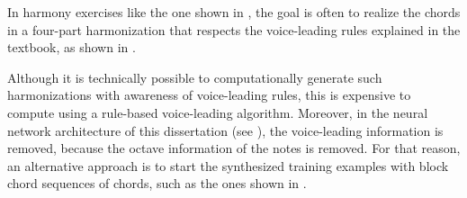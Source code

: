 
In harmony exercises like the one shown in
, the goal is often to
\gls{realize} the chords in a four-part harmonization that
respects the voice-leading rules explained in the textbook,
as shown in . 


Although it is technically possible to computationally
generate such harmonizations with awareness of voice-leading
rules, this is expensive to compute using a rule-based
voice-leading
algorithm.
Moreover, in the neural network architecture of this
dissertation (see ), the voice-leading
information is removed, because the octave information of
the notes is removed. For that reason, an alternative
approach is to start the synthesized training examples with
block chord sequences of chords, such as the ones shown in
.

